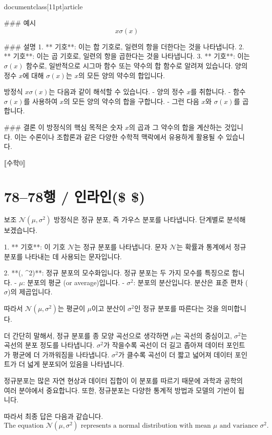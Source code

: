 \\documentclass[11pt]{article}
\begin{document}
### 예시
\[ x\sigma(x) \]

### 설명
1. ** 기호**: 이는 합 기호로, 일련의 항을 더한다는 것을 나타냅니다.
2. ** 기호**: 이는 곱 기호로, 일련의 항을 곱한다는 것을 나타냅니다.
3. ** 기호**: 이는 \( \sigma(x) \) 함수로, 일반적으로 시그마 함수 또는 약수의 합 함수로 알려져 있습니다. 양의 정수 \( x \)에 대해 \( \sigma(x) \)는 \( x \)의 모든 양의 약수의 합입니다.

방정식 \( x\sigma(x) \)는 다음과 같이 해석할 수 있습니다.
- 양의 정수 \( x \)를 취합니다.
- 함수 \( \sigma(x) \)를 사용하여 \( x \)의 모든 양의 약수의 합을 구합니다.
- 그런 다음 \( x \)와 \( \sigma(x) \)를 곱합니다.

### 결론
이 방정식의 핵심 목적은 숫자 \( x \)의 곱과 그 약수의 합을 계산하는 것입니다. 이는 수론이나 조합론과 같은 다양한 수학적 맥락에서 유용하게 활용될 수 있습니다.

⟦수학0⟧

\section*{78–78행 / 인라인(\$ \$)}
보조
\(\mathcal{N}(\mu, \sigma^2)\) 방정식은 정규 분포, 즉 가우스 분포를 나타냅니다. 단계별로 분석해 보겠습니다.

1. ** 기호**: 이 기호 \(\mathcal{N}\)는 정규 분포를 나타냅니다. 문자 \(\mathcal{N}\)는 확률과 통계에서 정규 분포를 나타내는 데 사용되는 문자입니다.

2. **(\mu, \sigma^2)**: 정규 분포의 모수화입니다. 정규 분포는 두 가지 모수를 특징으로 합니다.
- \(\mu\): 분포의 평균 (or average)입니다.
- \(\sigma^2\): 분포의 분산입니다. 분산은 표준 편차 (\(\sigma\))의 제곱입니다.

따라서 \(\mathcal{N}(\mu, \sigma^2)\)는 평균이 \(\mu\)이고 분산이 \(\sigma^2\)인 정규 분포를 따른다는 것을 의미합니다.

더 간단히 말해서, 정규 분포를 종 모양 곡선으로 생각하면 \(\mu\)는 곡선의 중심이고, \(\sigma^2\)는 곡선의 분포 정도를 나타냅니다. \(\sigma^2\)가 작을수록 곡선이 더 길고 좁아져 데이터 포인트가 평균에 더 가까워짐을 나타냅니다. \(\sigma^2\)가 클수록 곡선이 더 짧고 넓어져 데이터 포인트가 더 넓게 분포되어 있음을 나타냅니다.

정규분포는 많은 자연 현상과 데이터 집합이 이 분포를 따르기 때문에 과학과 공학의 여러 분야에서 중요합니다. 또한, 정규분포는 다양한 통계적 방법과 모델의 기반이 됩니다.

따라서 최종 답은 다음과 같습니다.
\[
\boxed{\text{The equation } \mathcal{N}(\mu, \sigma^2) \text{ represents a normal distribution with mean } \mu \text{ and variance } \sigma^2.}
\]
\end{document}
